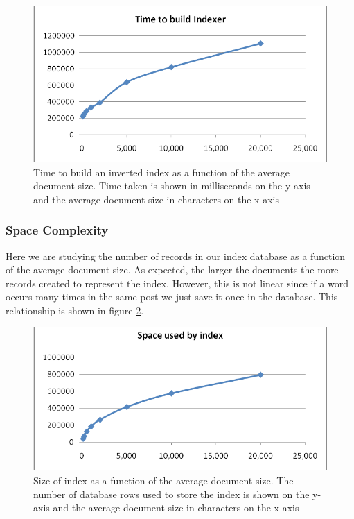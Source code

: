 \documentclass[10pt]{article}
\begin{document}
\begin{itemize}
  \begin{figure}[h!]
    \begin{center}
      \includegraphics[width=\textwidth,height=!]{docsizetimecomplexbuildindex}
    \end{center}
    \caption{Time to build an inverted index as a function of the
      average document size. Time taken is shown in milliseconds on the
      y-axis and the average document size in characters on the x-axis} 
    \label{fig:docsizetimecomplexbuildindex}
  \end{figure} 

\end{itemize}


\subsubsection{Space Complexity}
Here we are studying the number of records in our index database as a
function of the average document size. As expected, the larger the documents
the more records created to represent the index. However, this is not linear
since if a word occurs many times in the same post we just save it
once in the database. This relationship is shown in figure
\ref{fig:docsizespacecomplexbuildindex}. 

\begin{figure}[h!]
  \begin{center}
    \includegraphics[width=\textwidth,height=!]{docsizespacecomplexbuildindex}
  \end{center}
  \caption{Size of index as a function of the average document
    size. The number of database rows used to store the index is
      shown on the y-axis and the average document size in characters
      on the x-axis}  
  \label{fig:docsizespacecomplexbuildindex}
\end{figure} 
\end{document}
